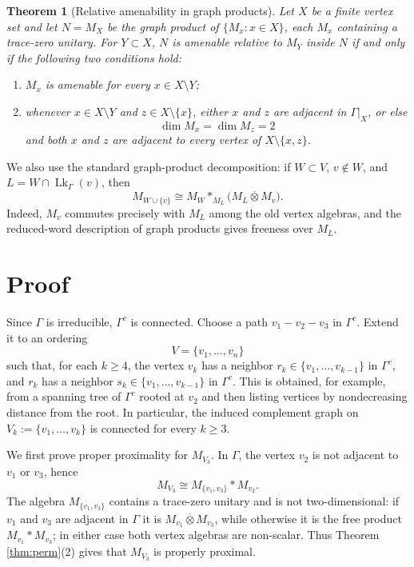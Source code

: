 \documentclass[12pt]{article}
\newtheorem{theorem}{Theorem}
\DeclareMathOperator{\Lk}{Lk}
\newcommand{\bbarotimes}{\mathbin{\overline{\otimes}}}
\begin{document}
\begin{theorem}[Relative amenability in graph products]\label{thm:relam}
Let $X$ be a finite vertex set and let
$N=M_X$ be the graph product of $\{M_x:x\in X\}$, each $M_x$ containing a
trace-zero unitary.  For $Y\subset X$, $N$ is amenable relative to $M_Y$ inside
$N$ if and only if the following two conditions hold:
\begin{enumerate}
\item $M_x$ is amenable for every $x\in X\setminus Y$;
\item whenever $x\in X\setminus Y$ and $z\in X\setminus\{x\}$, either
$x$ and $z$ are adjacent in $\Gamma|_X$, or else
\[
\dim M_x=\dim M_z=2
\]
and both $x$ and $z$ are adjacent to every vertex of
$X\setminus\{x,z\}$.
\end{enumerate}
\end{theorem}

We also use the standard graph-product decomposition: if $W\subset V$,
$v\notin W$, and $L=W\cap \Lk_\Gamma(v)$, then
\begin{equation}\label{eq:afp}
        M_{W\cup\{v\}}
        \cong
        M_W *_{M_L} \bigl(M_L\bbarotimes M_v\bigr).
\end{equation}
Indeed, $M_v$ commutes precisely with $M_L$ among the old vertex algebras, and
the reduced-word description of graph products gives freeness over $M_L$.

\section*{Proof}

Since $\Gamma$ is irreducible, $\Gamma^c$ is connected.  Choose a path
$v_1-v_2-v_3$ in $\Gamma^c$.  Extend it to an ordering
\[
        V=\{v_1,\ldots,v_n\}
\]
such that, for each $k\ge4$, the vertex $v_k$ has a neighbor
$r_k\in \{v_1,\ldots,v_{k-1}\}$ in $\Gamma^c$, and $r_k$ has a neighbor
$s_k\in\{v_1,\ldots,v_{k-1}\}$ in $\Gamma^c$.  This is obtained, for example,
from a spanning tree of $\Gamma^c$ rooted at $v_2$ and then listing vertices by
nondecreasing distance from the root.  In particular, the induced complement
graph on $V_k:=\{v_1,\ldots,v_k\}$ is connected for every $k\ge3$.

We first prove proper proximality for $M_{V_3}$.  In $\Gamma$, the vertex
$v_2$ is not adjacent to $v_1$ or $v_3$, hence
\[
        M_{V_3}\cong M_{\{v_1,v_3\}} * M_{v_2}.
\]
The algebra $M_{\{v_1,v_3\}}$ contains a trace-zero unitary and is not
two-dimensional: if $v_1$ and $v_3$ are adjacent in $\Gamma$ it is
$M_{v_1}\bbarotimes M_{v_3}$, while otherwise it is the free product
$M_{v_1}*M_{v_3}$; in either case both vertex algebras are non-scalar.  Thus
Theorem \ref{thm:perm}(2) gives that $M_{V_3}$ is properly proximal.
\end{document}
